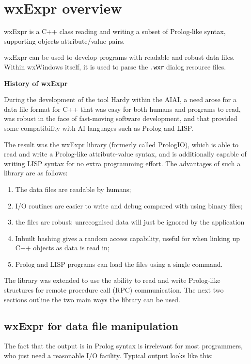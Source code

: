 \section{wxExpr overview}\label{exproverview}

wxExpr is a C++ class reading and writing a subset of Prolog-like syntax,
supporting objects attribute/value pairs.

wxExpr can be used to develop programs with readable and
robust data files. Within wxWindows itself, it is used to parse
the {\tt .wxr} dialog resource files.

{\bf History of wxExpr}

During the development of the tool Hardy within the AIAI, a need arose
for a data file format for C++ that was easy for both humans and
programs to read, was robust in the face of fast-moving software
development, and that provided some compatibility with AI languages
such as Prolog and LISP.

The result was the wxExpr library (formerly called PrologIO), which is able to read and write a
Prolog-like attribute-value syntax, and is additionally capable of
writing LISP syntax for no extra programming effort.  The advantages of
such a library are as follows:

\begin{enumerate}\itemsep=0pt
\item The data files are readable by humans;
\item I/O routines are easier to write and debug compared with using binary files;
\item the files are robust: unrecognised data will just be ignored by the application
\item Inbuilt hashing gives a random access capability, useful for when linking
up C++ objects as data is read in;
\item Prolog and LISP programs can load the files using a single command.
\end{enumerate}

The library was extended to use the ability to read and write
Prolog-like structures for remote procedure call (RPC) communication.
The next two sections outline the two main ways the library can be used.

\subsection{wxExpr for data file manipulation}\itemsep=0pt

The fact that the output is in Prolog syntax is irrelevant for most
programmers, who just need a reasonable I/O facility.  Typical output
looks like this:


